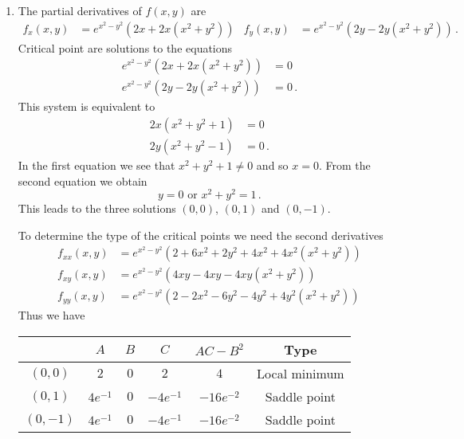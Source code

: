 \begin{solution}
\begin{enumerate}
\item
The partial derivatives of $f(x,y)$ are
\begin{align*}
f_x(x,y) &= e^{x^2-y^2} \left( 2x + 2x\left(x^2 + y^2\right)\right) &
f_y(x,y) &= e^{x^2-y^2} \left( 2y - 2y\left(x^2 + y^2\right)\right) \,.
\end{align*}
Critical point are solutions to the equations
\begin{align*}
e^{x^2-y^2} \left( 2x + 2x\left(x^2 + y^2\right)\right) &= 0\\
e^{x^2-y^2} \left( 2y - 2y\left(x^2 + y^2\right)\right) &= 0 \,.
\end{align*}
This system is equivalent to
\begin{align*}
2x\left(x^2 + y^2 + 1 \right) &= 0\\
2y\left(x^2 + y^2 - 1 \right) &= 0 \,.
\end{align*}
In the first equation we see that $x^2 + y^2 + 1 \neq 0$ and so $x=0$. From the second equation we obtain
\[
y=0 \text{ or } x^2 + y^2 = 1\,.
\]
This leads to the three solutions $(0,0)$, $(0,1)$ and $(0,-1)$.

To determine the type of the critical points we need the second derivatives
\begin{align*}
f_{xx}(x,y) &= e^{x^2-y^2}\left(2 + 6x^2 + 2y^2 + 4x^2 + 4x^2\left(x^2 + y^2\right)\right) \\
f_{xy}(x,y) &= e^{x^2-y^2}\left(4xy - 4xy - 4xy\left(x^2 + y^2\right)\right) \\
f_{yy}(x,y) &= e^{x^2-y^2}\left(2 - 2x^2 - 6y^2 - 4y^2 + 4y^2 \left(x^2 + y^2\right)\right)
\end{align*}
Thus we have
\begin{center}
\renewcommand{\arraystretch}{1.25}
\begin{tabular}{c|ccc|cc}
 & $A$ & $B$ & $C$ & $AC-B^2$ & Type \\ \hline
$\left(0, 0\right)$ & $2$ & $0$ & $2$ & $4$ & Local minimum \\
$\left(0, 1\right)$ &  $4e^{-1}$ & $0$ & $-4e^{-1}$ & $-16e^{-2}$ & Saddle point \\
$\left(0, -1\right)$ &  $4e^{-1}$ & $0$ & $-4e^{-1}$ & $-16e^{-2}$ & Saddle point
\end{tabular}
\end{center}


\end{enumerate}
\end{solution}
